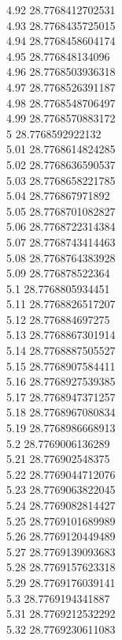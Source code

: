 {4.92	28.7768412702531\\
4.93	28.7768435725015\\
4.94	28.7768458604174\\
4.95	28.776848134096\\
4.96	28.7768503936318\\
4.97	28.7768526391187\\
4.98	28.7768548706497\\
4.99	28.7768570883172\\
5	28.7768592922132\\
5.01	28.7768614824285\\
5.02	28.7768636590537\\
5.03	28.7768658221785\\
5.04	28.776867971892\\
5.05	28.7768701082827\\
5.06	28.7768722314384\\
5.07	28.7768743414463\\
5.08	28.7768764383928\\
5.09	28.776878522364\\
5.1	28.7768805934451\\
5.11	28.7768826517207\\
5.12	28.776884697275\\
5.13	28.7768867301914\\
5.14	28.7768887505527\\
5.15	28.7768907584411\\
5.16	28.7768927539385\\
5.17	28.7768947371257\\
5.18	28.7768967080834\\
5.19	28.7768986668913\\
5.2	28.7769006136289\\
5.21	28.776902548375\\
5.22	28.7769044712076\\
5.23	28.7769063822045\\
5.24	28.7769082814427\\
5.25	28.7769101689989\\
5.26	28.7769120449489\\
5.27	28.7769139093683\\
5.28	28.7769157623318\\
5.29	28.7769176039141\\
5.3	28.7769194341887\\
5.31	28.7769212532292\\
5.32	28.7769230611083\\
}
